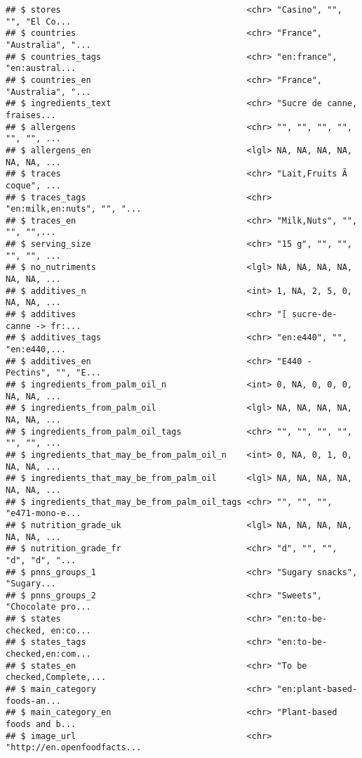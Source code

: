 \documentclass[]{article}
\begin{document}
\begin{verbatim}
## $ stores                                     <chr> "Casino", "", "", "El Co...
## $ countries                                  <chr> "France", "Australia", "...
## $ countries_tags                             <chr> "en:france", "en:austral...
## $ countries_en                               <chr> "France", "Australia", "...
## $ ingredients_text                           <chr> "Sucre de canne, fraises...
## $ allergens                                  <chr> "", "", "", "", "", "", ...
## $ allergens_en                               <lgl> NA, NA, NA, NA, NA, NA, ...
## $ traces                                     <chr> "Lait,Fruits Ã  coque", ...
## $ traces_tags                                <chr> "en:milk,en:nuts", "", "...
## $ traces_en                                  <chr> "Milk,Nuts", "", "", "",...
## $ serving_size                               <chr> "15 g", "", "", "", "", ...
## $ no_nutriments                              <lgl> NA, NA, NA, NA, NA, NA, ...
## $ additives_n                                <int> 1, NA, 2, 5, 0, NA, NA, ...
## $ additives                                  <chr> "[ sucre-de-canne -> fr:...
## $ additives_tags                             <chr> "en:e440", "", "en:e440,...
## $ additives_en                               <chr> "E440 - Pectins", "", "E...
## $ ingredients_from_palm_oil_n                <int> 0, NA, 0, 0, 0, NA, NA, ...
## $ ingredients_from_palm_oil                  <lgl> NA, NA, NA, NA, NA, NA, ...
## $ ingredients_from_palm_oil_tags             <chr> "", "", "", "", "", "", ...
## $ ingredients_that_may_be_from_palm_oil_n    <int> 0, NA, 0, 1, 0, NA, NA, ...
## $ ingredients_that_may_be_from_palm_oil      <lgl> NA, NA, NA, NA, NA, NA, ...
## $ ingredients_that_may_be_from_palm_oil_tags <chr> "", "", "", "e471-mono-e...
## $ nutrition_grade_uk                         <lgl> NA, NA, NA, NA, NA, NA, ...
## $ nutrition_grade_fr                         <chr> "d", "", "", "d", "d", "...
## $ pnns_groups_1                              <chr> "Sugary snacks", "Sugary...
## $ pnns_groups_2                              <chr> "Sweets", "Chocolate pro...
## $ states                                     <chr> "en:to-be-checked, en:co...
## $ states_tags                                <chr> "en:to-be-checked,en:com...
## $ states_en                                  <chr> "To be checked,Complete,...
## $ main_category                              <chr> "en:plant-based-foods-an...
## $ main_category_en                           <chr> "Plant-based foods and b...
## $ image_url                                  <chr> "http://en.openfoodfacts...

\end{verbatim}
\end{document}
